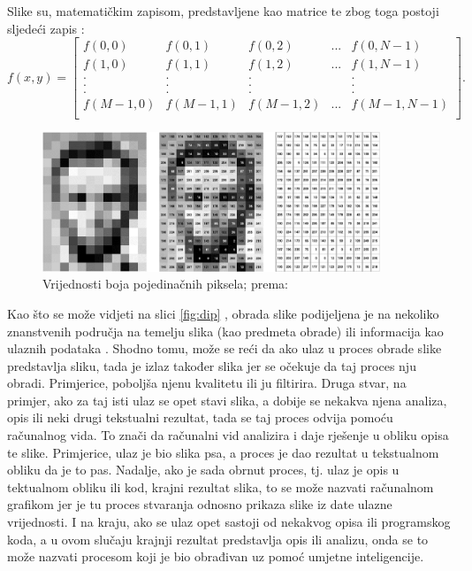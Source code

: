 \documentclass[]{foi} %
\begin{document}
\noindent
Slike su, matematičkim zapisom, predstavljene kao matrice te zbog toga postoji sljedeći zapis \cite{digital}:
\[
f(x,y) = 
\begin{bmatrix}
f(0,0) & f(0,1) & f(0,2) & ... & f(0,N-1)\\
f(1,0) & f(1,1) & f(1,2) & ... & f(1,N-1)\\
. & . & . &  & .\\
. & . & . &  & .\\
. & . & . &  & .\\
f(M-1,0) & f(M-1,1) & f(M-1,2) & ... & f(M-1,N-1)\\
\end{bmatrix}.
\]

\begin{figure}[!ht]
    \centering
    \includegraphics[width=0.9\textwidth]{slike/matrica.png}
    \caption{Vrijednosti boja pojedinačnih piksela; prema: \cite{adobe}}
    \label{fig:matrica}
\end{figure}

Kao što se može vidjeti na slici \ref{fig:dip} \cite{digital}, obrada slike podijeljena je na nekoliko znanstvenih područja na temelju slika (kao predmeta obrade) ili informacija kao ulaznih podataka \cite{digital}. Shodno tomu, može se reći da ako ulaz u proces obrade slike predstavlja sliku, tada je izlaz također slika jer se očekuje da taj proces nju obradi. Primjerice, poboljša njenu kvalitetu ili ju filtirira. Druga stvar, na primjer, ako za taj isti ulaz se opet stavi slika, a dobije se nekakva njena analiza, opis ili neki drugi tekstualni rezultat, tada se taj proces odvija pomoću računalnog vida. To znači da računalni vid analizira i daje rješenje u obliku opisa te slike. Primjerice, ulaz je bio slika psa, a proces je dao rezultat u tekstualnom obliku da je to pas. Nadalje, ako je sada obrnut proces, tj. ulaz je opis u tektualnom obliku ili kod, krajni rezultat slika, to se može nazvati računalnom grafikom jer je tu proces stvaranja odnosno prikaza slike iz date ulazne vrijednosti. I na kraju, ako se ulaz opet sastoji od nekakvog opisa ili programskog koda, a u ovom slučaju krajnji rezultat predstavlja opis ili analizu, onda se to može nazvati procesom koji je bio obrađivan uz pomoć umjetne inteligencije.
\end{document}
